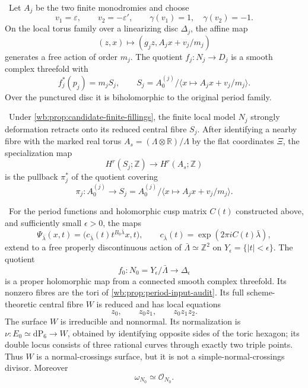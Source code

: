 \begin{proposition}
\label{wb:prop:candidate-finite-fillings}
\ Let \(A_j\) be the two finite monodromies and choose
\[
 v_1=\varepsilon,\qquad v_2=-\varepsilon',
 \qquad \gamma(v_1)=1,\quad\gamma(v_2)=-1.
\]
On the local torus family over a linearizing disc \(\Delta_j\), the affine
map
\[
 (z,x)\longmapsto(g_jz,A_jx+v_j/m_j)
\tag{2.9}
\]
generates a free action of order \(m_j\).  The quotient
\(f_j:N_j\to D_j\) is a smooth complex threefold with
\[
 f_j^*(p_j)=m_jS_j,\qquad
 S_j=A_0^{(j)}/\langle x\mapsto A_jx+v_j/m_j\rangle.
\tag{2.10}
\]
Over the punctured disc it is biholomorphic to the original period family.
\end{proposition}

\begin{lemma}
\label{wb:lem:finite-filling-stalk-map}
\ Under \cref{wb:prop:candidate-finite-fillings}, the finite local
model \(N_j\) strongly deformation retracts onto its reduced central fibre
\(S_j\).  After identifying a nearby fibre with the marked real torus
\(A_s=(\Lambda\otimes\mathbb R)/\Lambda\) by the flat coordinates
\(\Xi\), the specialization map
\[
 H^r(S_j;\mathbb Z)\longrightarrow H^r(A_s;\mathbb Z)
\]
is the pullback \(\pi_j^*\) of the quotient covering
\[
 \pi_j:A_0^{(j)}\longrightarrow
 S_j=A_0^{(j)}/\langle x\mapsto A_jx+v_j/m_j\rangle .
\]
\end{lemma}

\begin{theorem}
\label{wb:thm:candidate-cusp-geometry}
\ For the period functions and holomorphic cusp matrix \(C(t)\)
constructed above, and sufficiently small \(\epsilon>0\), the maps
\[
 \Psi_{\bar\lambda}(x,t)=
 \bigl(c_{\bar\lambda}(t)t^{B_0\bar\lambda}x,t\bigr),
 \qquad
 c_{\bar\lambda}(t)=\exp(2\pi iC(t)\bar\lambda),
\tag{2.5}
\]
extend to a free properly discontinuous action of
\(\bar\Lambda\simeq\mathbb Z^2\) on
\(Y_\epsilon=\{|t|<\epsilon\}\).  The quotient
\[
 f_0:N_0=Y_\epsilon/\bar\Lambda\longrightarrow\Delta_\epsilon
\]
is a proper holomorphic map from a connected smooth complex threefold.
Its nonzero fibres are the tori of \cref{wb:prop:period-input-audit}.  Its full
scheme-theoretic central fibre \(W\) is reduced and has local equations
\[
 z_0,\qquad z_0z_1,\qquad z_0z_1z_2.
\tag{2.6}
\]
The surface \(W\) is irreducible and nonnormal.  Its normalization is
\(\nu:E_0\simeq\mathrm{dP}_6\to W\), obtained by identifying opposite sides
of the toric hexagon; its double locus consists of three rational curves
through exactly two triple points.  Thus \(W\) is a normal-crossings surface,
but it is not a simple-normal-crossings divisor.  Moreover
\[
 \omega_{N_0}\simeq\mathcal O_{N_0}.
\tag{2.6a}
\]
\end{theorem}


